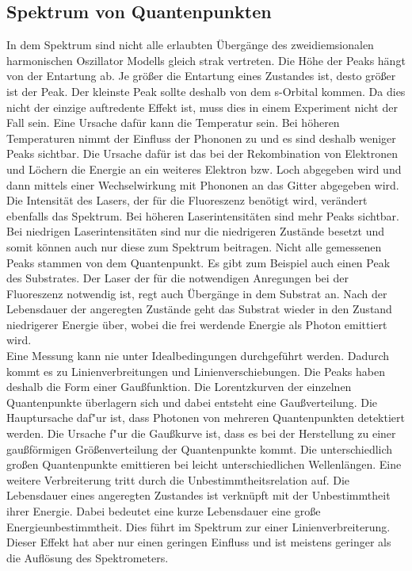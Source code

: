 \subsection{Spektrum von Quantenpunkten}
In dem Spektrum sind nicht alle erlaubten Übergänge des zweidiemsionalen harmonischen Oszillator Modells gleich strak vertreten. Die Höhe der Peaks hängt von der Entartung ab. Je grö{\ss}er die Entartung eines Zustandes ist, desto grö{\ss}er ist der Peak. Der kleinste Peak sollte deshalb von dem s-Orbital kommen. Da dies nicht der einzige auftredente Effekt ist, muss dies in einem Experiment nicht der Fall sein. Eine Ursache dafür kann die Temperatur sein. Bei höheren Temperaturen nimmt der Einfluss der Phononen zu und es sind deshalb weniger Peaks sichtbar. 
Die Ursache dafür ist das bei der Rekombination von Elektronen und Löchern die Energie an ein weiteres Elektron bzw. Loch abgegeben wird und dann mittels einer Wechselwirkung mit Phononen an das Gitter abgegeben wird.
Die Intensität des Lasers, der für die Fluoreszenz benötigt wird, verändert ebenfalls das Spektrum. Bei höheren Laserintensitäten sind mehr Peaks sichtbar. 
Bei niedrigen Laserintensitäten sind nur die niedrigeren Zustände besetzt und somit können auch nur diese zum Spektrum beitragen.
Nicht alle gemessenen Peaks stammen von dem Quantenpunkt. Es gibt zum Beispiel auch einen Peak des Substrates.
Der Laser der für die notwendigen Anregungen bei der Fluoreszenz notwendig ist, regt auch Übergänge in dem Substrat an. Nach der Lebensdauer der angeregten Zustände geht das Substrat wieder in den Zustand niedrigerer Energie über, wobei die frei werdende Energie als Photon emittiert wird. \\
Eine Messung kann nie unter Idealbedingungen durchgeführt werden. Dadurch kommt es zu Linienverbreitungen und Linienverschiebungen. Die Peaks haben deshalb die Form einer Gau{\ss}funktion.
Die Lorentzkurven der einzelnen Quantenpunkte überlagern sich und dabei entsteht eine Gaußverteilung. 
Die Hauptursache daf"ur ist, dass Photonen von mehreren Quantenpunkten detektiert werden. 
Die Ursache f"ur die Gau{\ss}kurve ist, dass es bei der Herstellung zu einer gaußförmigen Größenverteilung der Quantenpunkte kommt. 
Die unterschiedlich großen Quantenpunkte emittieren bei leicht unterschiedlichen Wellenlängen.
Eine weitere Verbreiterung tritt durch die Unbestimmtheitsrelation auf. Die Lebensdauer eines angeregten Zustandes ist verknüpft mit der Unbestimmtheit ihrer Energie.  Dabei bedeutet eine kurze Lebensdauer eine gro{\ss}e Energieunbestimmtheit. Dies führt im Spektrum zur einer Linienverbreiterung.
Dieser Effekt hat aber nur einen geringen Einfluss und ist meistens geringer als die Auflösung des Spektrometers. 
